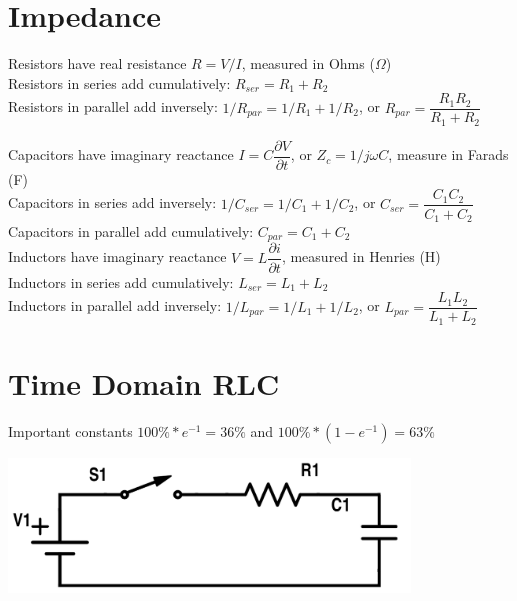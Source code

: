 \documentclass[12pt]{article}
\begin{document}
\section*{Impedance}
Resistors have real resistance $R = V/I$, measured in Ohms ($\Omega$)\\
Resistors in series add cumulatively: $R_{ser} = R_1+R_2$\\
Resistors in parallel add inversely:  $1/R_{par} = 1/R_1 + 1/R_2$, or $R_{par} = \dfrac{R_1R_2}{R_1+R_2}$\\

\newpage

Capacitors have imaginary reactance $I = C \dfrac{\partial V}{\partial t}$, or $Z_c = 1/j\omega C$, measure in Farads (F)\\
Capacitors in series add inversely: $1/C_{ser} = 1/C_1 + 1/C_2$, or $C_{ser} = \dfrac{C_1C_2}{C_1+C_2}$\\
Capacitors in parallel add cumulatively: $C_{par} = C_1 + C_2$\\

Inductors have imaginary reactance $V = L \dfrac{\partial i}{\partial t}$, measured in Henries (H)\\
Inductors in series add cumulatively: $L_{ser} = L_1 + L_2$\\
Inductors in parallel add inversely: $1/L_{par} = 1/L_1 + 1/L_2$, or $L_{par} = \dfrac{L_1L_2}{L_1+L_2}$\\


\section*{Time Domain RLC}

Important constants $100\%*e^{-1} = 36\%$ and  $100\%*(1-e^{-1}) = 63\%$ \\

\begin{center}
	\includegraphics[width=0.8\textwidth]{assets/ece210-rc.png}
\end{center}
\end{document}
